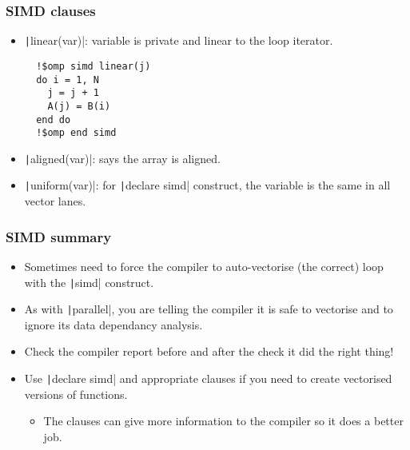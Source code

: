 \documentclass[aspectratio=169]{beamer}
\begin{document}
\begin{frame}[fragile]
\frametitle{SIMD clauses}
\begin{itemize}
  \item \texttt|linear(var)|: variable is private and linear to the loop iterator.
  \begin{verbatim}
  !$omp simd linear(j)
  do i = 1, N
    j = j + 1
    A(j) = B(i)
  end do
  !$omp end simd
  \end{verbatim}
  \item \texttt|aligned(var)|: says the array is aligned.
  \item \texttt|uniform(var)|: for \texttt|declare simd| construct, the variable is the same in all vector lanes.
\end{itemize}
\end{frame}

\begin{frame}
\frametitle{SIMD summary}

\begin{itemize}
  \item Sometimes need to force the compiler to auto-vectorise (the correct) loop with the \texttt|simd| construct.
  \item As with \texttt|parallel|, you are telling the compiler it is safe to vectorise and to ignore its data dependancy analysis.
  \item Check the compiler report before and after the check it did the right thing!
  \item Use \texttt|declare simd| and appropriate clauses if you need to create vectorised versions of functions.
  \begin{itemize}
    \item The clauses can give more information to the compiler so it does a better job.
  \end{itemize}
\end{itemize}

\end{frame}

\end{document}
